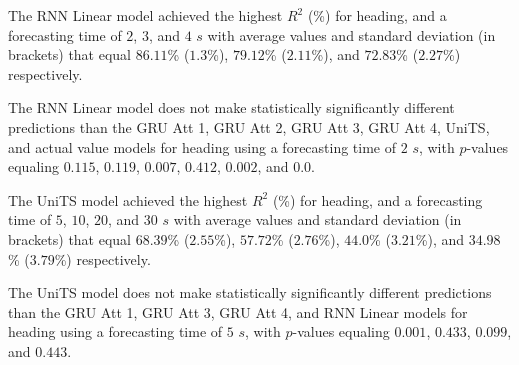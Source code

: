 \begin{table}[!ht]
	\centering
	\caption{The average $R^{2}$ (\%), with standard deviation in brackets, across k-fold validation datasets for the heading estimated on the k-fold testing datasets by different RNN models, and forecasting times.}
	\label{tab:best_direction_R2}
\end{table}

The RNN Linear model achieved the highest $R^{2}$ (\%) for heading, and a forecasting time of $2$, $3$, and $4$ $s$ with average values and standard deviation (in brackets) that equal $86.11$\% ($1.3$\%), $79.12$\% ($2.11$\%), and $72.83$\% ($2.27$\%) respectively.

The RNN Linear model does not make statistically significantly different predictions than the GRU Att 1, GRU Att 2, GRU Att 3, GRU Att 4, UniTS, and actual value models for heading using a forecasting time of $2$ $s$, with $p$-values equaling $0.115$, $0.119$, $0.007$, $0.412$, $0.002$, and $0.0$.

The UniTS model achieved the highest $R^{2}$ (\%) for heading, and a forecasting time of $5$, $10$, $20$, and $30$ $s$ with average values and standard deviation (in brackets) that equal $68.39$\% ($2.55$\%), $57.72$\% ($2.76$\%), $44.0$\% ($3.21$\%), and $34.98$\% ($3.79$\%) respectively.

The UniTS model does not make statistically significantly different predictions than the GRU Att 1, GRU Att 3, GRU Att 4, and RNN Linear models for heading using a forecasting time of $5$ $s$, with $p$-values equaling $0.001$, $0.433$, $0.099$, and $0.443$.

